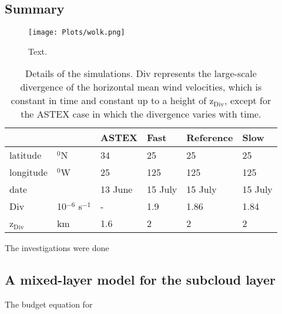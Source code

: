 \documentclass[12pt]{article}
\begin{document}
\subsection{Summary }

%
\begin{figure*}[ht]
\texttt{[image: Plots/wolk.png]}
\caption{Text.}
\label{fig:test}
\end{figure*}
%
%
 

\begin{table*}
\begin{tabular}{ l l l l l l}
\hline
     &          & ASTEX & Fast & Reference & Slow \\           
\hline 
latitude  & $^0$N  &     34 &   25  &   25 & 25  \\
longitude & $^0$W  &     25 &   125  &   125 & 125  \\
date      &        & 13 June  & 15 July & 15 July & 15 July \\ 
Div       & 10$^{-6}$ s$^{-1}$   &  - & 1.9 & 1.86 & 1.84 \\  
z$_{\mathrm{Div}}$ & km & 1.6 & 2  & 2 & 2 \\
\hline       
\end{tabular}   
\caption{Details of the simulations. Div represents the large-scale divergence of the horizontal mean wind velocities, which is constant in time and constant up to a height of z$_{\mathrm{Div}}$, except for the ASTEX case in which the divergence varies with time.}
\label{tab:set_up}
\end{table*}
 
\begin{acknowledgment}
The investigations were done  
\end{acknowledgment}


 \renewcommand{\theequation}{A-\arabic{equation}}
  \setcounter{equation}{0}  %
\begin{appendices}

\section{A mixed-layer model for the subcloud layer}

The budget equation for 
\end{appendices}

{}
{\clearpage}


\end{document}
